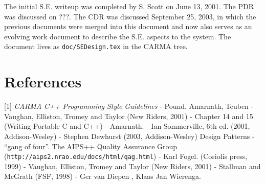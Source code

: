 \documentclass{article}
\begin{document}
The initial S.E. writeup was completed by S. Scott on June 13, 2001. The PDR
was discussed on ???. The CDR was discussed September 25, 2003, in which
the previous documents were merged into this document and now also serves
as an evolving work document to describe the S.E. aspects to the system.
The document lives as {\tt doc/SEDesign.tex} in the CARMA tree.

\newpage

\section*{References}
[1] {\it CARMA C++ Programming Style Guidelines} - Pound. Amarnath, Teuben
  - Vaughan, Elliston, Tromey and Taylor
(New Riders, 2001) - Chapter 14 and 15 (Writing Portable C and C++)
 - Amarnath.
 - Ian Sommerville, 6th ed.  (2001, Addison-Wesley)
 - Stephen Dewhurst (2003, Addison-Wesley)
\newline
[7] Design Patterns  - ``gang of four''.
\newline
[8] The AIPS++ Quality Assurance Group ({\tt http://aips2.nrao.edu/docs/html/qag.html})
 - Karl Fogel.
(Coriolis press, 1999)
  - Vaughan, Elliston, Tromey and Taylor
(New Riders, 2001)
 - Stallman and McGrath
(FSF, 1998)
 - Ger van Diepen ,  Klaas Jan Wierenga.
\end{document}
